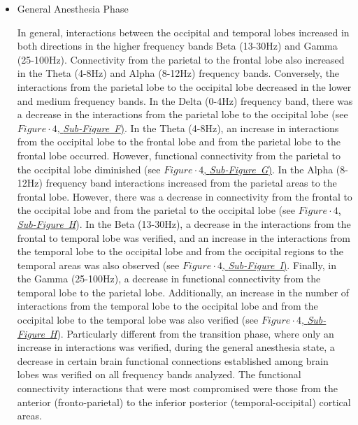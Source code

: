 \documentclass[twoside]{article}
\begin{document}
\begin{multicols}{2}
\begin{itemize}
\newpage

\item General Anesthesia Phase

In general, interactions between the occipital and temporal lobes increased in both directions in the higher frequency bands Beta (13-30Hz) and Gamma (25-100Hz). Connectivity from the parietal to the frontal lobe also increased in the Theta (4-8Hz) and Alpha (8-12Hz) frequency bands. Conversely, the interactions from the parietal lobe to the occipital lobe decreased in the lower and medium frequency bands.
In the Delta (0-4Hz) frequency band, there was a decrease in the interactions from the parietal lobe to the occipital lobe (see \hyperlink{FIGURE4}{$Figure \cdot 4$, \mbox{\textit{Sub-Figure F})}}. In the Theta (\mbox{4-8Hz}), an increase in interactions from the occipital lobe to the frontal lobe and from the parietal lobe to the frontal lobe occurred. However, functional connectivity from the parietal to the occipital lobe diminished (see \hyperlink{FIGURE4}{$Figure \cdot 4$, \mbox{\textit{Sub-Figure G}})}. In the Alpha (8-12Hz) frequency band interactions increased from the parietal areas to the frontal lobe. However, there was a decrease in connectivity from the frontal to the occipital lobe and from the parietal to the occipital lobe (see \hyperlink{FIGURE4}{$Figure \cdot 4$, \mbox{\textit{Sub-Figure H}}}). In the Beta (\mbox{13-30Hz}), a decrease in the interactions from the frontal to temporal lobe was verified, and an increase in the interactions from the temporal lobe to the occipital lobe and from the occipital regions to the temporal areas was also observed (see \hyperlink{FIGURE4}{$Figure \cdot 4$, \textit{\mbox{Sub-Figure I}})}. Finally, in the Gamma (\mbox{25-100Hz}), a decrease in functional connectivity from the temporal lobe to the parietal lobe. Additionally, an increase in the number of interactions from the temporal lobe to the occipital lobe and from the occipital lobe to the temporal lobe was also verified (see \hyperlink{FIGURE4}{$Figure \cdot 4$, \textit{\mbox{Sub-Figure H}}}).
Particularly different from the transition phase, where only an increase in interactions was verified, during the general anesthesia state, a decrease in certain brain functional connections established among brain lobes was verified on all frequency bands analyzed. The functional connectivity interactions that were most compromised were those from the anterior (fronto-parietal) to the inferior posterior (temporal-occipital) cortical areas.
 
\end{itemize}



\end{multicols}
\end{document}
